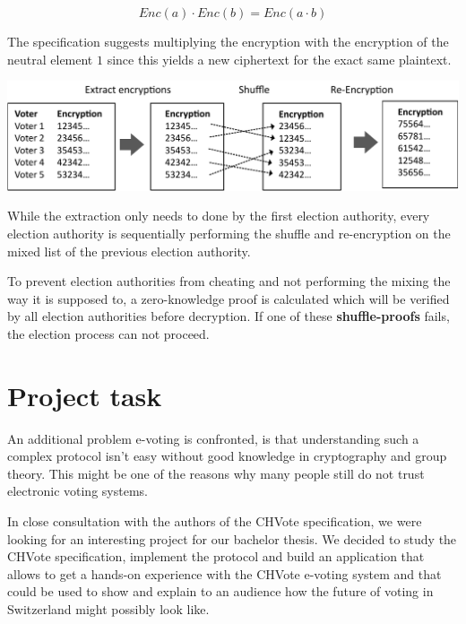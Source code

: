 \begin{equation*}Enc(a) \cdot Enc(b) = Enc(a \cdot b)\end{equation*}

The specification suggests multiplying the encryption with the encryption of the neutral element $1$ since this yields a new ciphertext for the exact same plaintext.

\begin{center}
\includegraphics[scale=0.95]{assets/mixing.pdf}
\label{Mixing}%
\end{center}

While the extraction only needs to done by the first election authority, every election authority is sequentially performing the shuffle and re-encryption on the mixed list of the previous election authority.

To prevent election authorities from cheating and not performing the mixing the way it is supposed to, a zero-knowledge proof is calculated which will be verified by all election authorities before decryption. If one of these \textbf{shuffle-proofs} fails, the election process can not proceed.

\section{Project task}
An additional problem e-voting is confronted, is that understanding such a complex protocol isn't easy without good knowledge in cryptography and group theory. This might be one of the reasons why many people still do not trust electronic voting systems. 

In close consultation with the authors of the CHVote specification, we were looking for an interesting project for our bachelor thesis. We decided to study the CHVote specification, implement the protocol and build an application that allows to get a hands-on experience with the CHVote e-voting system and that could be used to show and explain to an audience how the future of voting in Switzerland might possibly look like.

